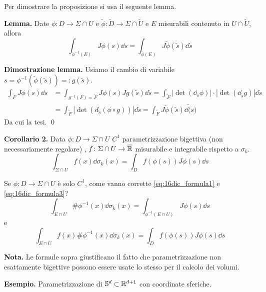 Per dimostrare la proposizione si usa il seguente lemma.

\textbf{Lemma.} Date $\phi \colon D \to \Sigma \cap U$ e $\tilde{\phi} \colon \tilde{D} \to \Sigma \cap \tilde{U}$ e $E$ misurabili contenuto in $U \cap \tilde{U}$, allora
%
\begin{equation}
	\label{eq:16dic_formula2} \tag{2}
	\int_{\phi^{-1}(E)} J\phi(s) \dd s = \int_{\tilde{\phi}(E)} J\tilde{\phi}(\tilde{s}) \dd \tilde{s}
\end{equation}
%

\textbf{Dimostrazione lemma.} Usiamo il cambio di variabile $s = \phi^{-1}(\tilde{\phi}(\tilde{s})) =: g(\tilde{s})$.
\begin{align*}
	\int_F J\phi(s) \dd s & = \int_{g^{-1}(F) = \tilde{F}} J\phi(s) Jg(\tilde{s}) \dd \tilde{s}
	= \int_{\tilde{F}} |\det(\dd_s \phi)| \cdot | \det(\dd_{\tilde{s}}g)| \dd \tilde{s} \\
	& = \int_{\tilde{F}} \left| \det (d_{\tilde{s}}(\phi \circ g)) \right| \dd \tilde{s}
	= \int_{\tilde{F}} J \tilde{\phi}(\tilde{s}) \dd \tilde(s)
\end{align*}
%
Da cui la tesi.
\qed

\textbf{Corollario 2.} Data $\phi \colon D \to \Sigma \cap U$ $C^1$ parametrizzazione bigettiva (non necessariamente regolare) , $f \colon \Sigma \cap U \to \overline{\mathbb R}$ misurabile e integrabile rispetto a $\sigma_k$.
%
\begin{equation}
	\label{eq:16dic_formula3} \tag{3}
	\int_{\Sigma \cap U} f(x) \dd \sigma_k(x) = \int_D f(\phi(s)) J\phi(s) \dd s
\end{equation}

Se $\phi \colon D \to \Sigma \cap U$ è solo $C^1$, come vanno corrette \eqref{eq:16dic_formula1} e \eqref{eq:16dic_formula3}?
\begin{equation}
	\tag{1'}
	\int_{E \cap U} \# \phi^{-1}(x) \dd \sigma_k(x) = \int_{\phi^{-1}(E \cap U)} J\phi(s) \dd s
\end{equation}
e
\begin{equation}
	\tag{3'}
	\int_{E \cap U} f(x) \# \phi^{-1}(x) \dd \sigma_k (x) = \int_D f(\phi(s)) J\phi(s) \dd s
\end{equation}

\textbf{Nota.} Le formule sopra giustificano il fatto che parametrizzazione non esattamente bigettive possono essere usate lo stesso per il calcolo dei volumi.

\textbf{Esempio.} Parametrizzazione di $\mathbb{S}^d \subset \mathbb R^{d+1}$ con coordinate sferiche.

